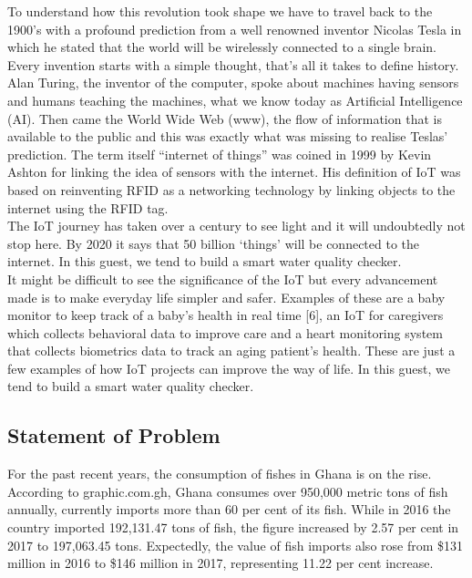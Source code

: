 \documentclass[12pt]{article}
\begin{document}
			To understand how this revolution took shape we have to travel back to the 1900’s with a profound prediction from a well renowned inventor Nicolas Tesla in which he stated that the world will be wirelessly connected to a single brain. Every invention starts with a simple thought, that’s all it takes to define history. Alan Turing, the inventor of the computer, spoke about machines having sensors and humans teaching the machines, what we know today as Artificial Intelligence (AI). Then came the World Wide Web (www), the flow of information that is available to the public and this was exactly what was missing to realise Teslas’ prediction. The term itself “internet of things” was coined in 1999 by Kevin Ashton for linking the idea of sensors with the internet. His definition of IoT was based on reinventing RFID as a networking technology by linking objects to the internet using the RFID tag.\\
			
			The IoT journey has taken over a century to see light and it will undoubtedly not stop here. By 2020 it says that 50 billion ‘things’ will be connected to the internet. In this guest, we tend to build a smart water quality checker.\\
			
			It might be difficult to see the significance of the IoT but every advancement made is to make everyday life simpler and safer. Examples of these are a baby monitor to keep track of a baby’s health in real time [6], an IoT for caregivers which collects behavioral data to improve care and a heart monitoring system that collects biometrics data to track an aging patient’s health. These are just a few examples of how IoT projects can improve the way of life. In this guest, we tend to build a smart water quality checker.\\
			
			\subsection*{Statement of Problem}
			For the past recent years, the consumption of fishes in Ghana is on the rise. According to graphic.com.gh, Ghana consumes over 950,000 metric tons of fish annually, currently imports more than 60 per cent of its fish. While in 2016 the country imported 192,131.47 tons of fish, the figure increased by 2.57 per cent in 2017 to 197,063.45 tons.
Expectedly, the value of fish imports also rose from \$131 million in 2016 to \$146 million in 2017, representing 11.22 per cent increase.     \\
\end{document}
